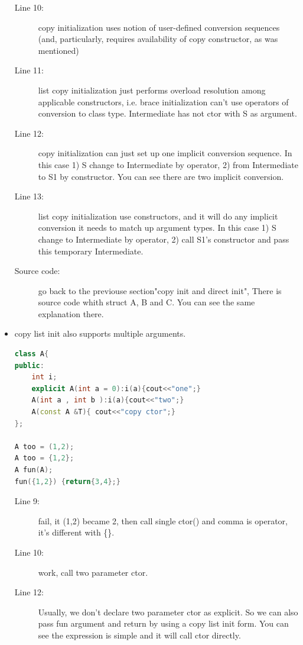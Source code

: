 \documentclass[a4paper,11pt,twoside]{book}
\begin{document}
\begin{itemize}
	\begin{description}
		\item[Line 10:] copy initialization uses notion of user-defined conversion sequences (and, particularly, requires availability of copy constructor, as was mentioned)
		
		\item[Line 11:] list copy initialization just performs overload resolution among applicable constructors, i.e. brace initialization can't use operators of conversion to class type. Intermediate has not ctor with S as argument.
		
		\item[Line 12:] copy initialization can just set up one implicit conversion sequence. In this case 1) S change to Intermediate by operator, 2) from Intermediate to S1 by constructor.  You can see there are two implicit conversion.
		
		\item[Line 13:] list copy initialization use constructors, and it will do any implicit conversion it needs to match up argument types. In this case 1) S change to Intermediate by operator, 2) call S1's constructor and pass this temporary Intermediate.
		\item [Source code:] go back to the previouse section"copy init and direct init", There is source code whith struct A, B and C. You can see the same explanation there. 
	\end{description}
	
	\item copy list init also supports multiple arguments.
\begin{lstlisting}[frame=single, language=c++]
class A{
public:
	int i;
	explicit A(int a = 0):i(a){cout<<"one";}
	A(int a , int b ):i(a){cout<<"two";}
	A(const A &T){ cout<<"copy ctor";} 
};
		
A too = (1,2); 
A too = {1,2};
A fun(A);
fun({1,2}) {return{3,4};}
\end{lstlisting}
	\begin{description}
		\item[Line 9:] fail, it (1,2) became 2, then call single ctor() and comma is operator, it's different with \{\}.
		
		\item[Line 10:] work, call two parameter ctor. 
		
		\item[Line 12:] Usually, we don't declare two parameter ctor as explicit. So we can also pass fun argument and return by using a copy list init form. You can see the expression is simple and it will call ctor directly. 
	\end{description}
	

\end{itemize}
\end{document}
